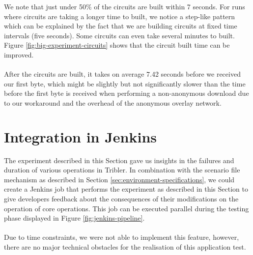 We note that just under 50\% of the circuits are built within 7 seconds. For runs where circuits are taking a longer time to built, we notice a step-like pattern which can be explained by the fact that we are building circuits at fixed time intervals (five seconds). Some circuits can even take several minutes to built. Figure \ref{fig:big-experiment-circuits} shows that the circuit built time can be improved.\\\\
After the circuits are built, it takes on average 7.42 seconds before we received our first byte, which might be slightly but not significantly slower than the time before the first byte is received when performing a non-anonymous download due to our workaround and the overhead of the anonymous overlay network.

\section{Integration in Jenkins}
The experiment described in this Section gave us insights in the failures and duration of various operations in Tribler. In combination with the scenario file mechanism as described in Section \ref{sec:environment-specifications}, we could create a Jenkins job that performs the experiment as described in this Section to give developers feedback about the consequences of their modifications on the operation of core operations. This job can be executed parallel during the testing phase displayed in Figure \ref{fig:jenkins-pipeline}.\\\\
 Due to time constraints, we were not able to implement this feature, however, there are no major technical obstacles for the realisation of this application test.